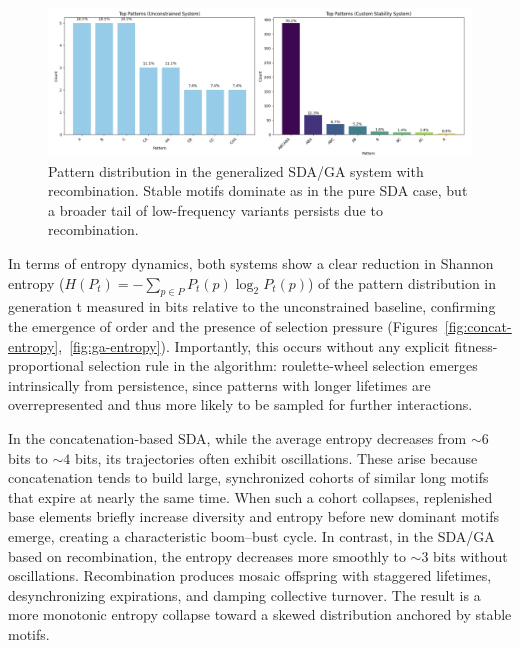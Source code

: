\documentclass[life,article,submit,pdftex,moreauthors]{Definitions/mdpi}
\begin{document}
\begin{figure}[H]
    \centering
    \includegraphics[width=1\textwidth]{SDA-GA-patterns.png}
    \caption{Pattern distribution in the generalized SDA/GA system with recombination. Stable motifs dominate as in the pure SDA case, but a broader tail of low-frequency variants persists due to recombination.}
    \label{fig:ga-patterns}
\end{figure}

In terms of entropy dynamics, both systems show a clear reduction in Shannon entropy ($H(P_t) = - \sum_{p \in P} P_t(p) \log_2 P_t(p)$) of
the pattern distribution in generation t measured in bits relative to the unconstrained baseline, confirming the emergence of order and the presence of selection pressure (Figures~\ref{fig:concat-entropy},~\ref{fig:ga-entropy}). Importantly, this occurs without any explicit fitness-proportional selection rule in the algorithm: roulette-wheel selection emerges intrinsically from persistence, since patterns with longer lifetimes are overrepresented and thus more likely to be sampled for further interactions.

In the concatenation-based SDA, while the average entropy decreases from $\sim6$ bits to $\sim4$ bits, its trajectories often exhibit oscillations. These arise because concatenation tends to build large, synchronized cohorts of similar long motifs that expire at nearly the same time. When such a cohort collapses, replenished base elements briefly increase diversity and entropy before new dominant motifs emerge, creating a characteristic boom–bust cycle. In contrast, in the SDA/GA based on recombination, the entropy decreases more smoothly to $\sim3$ bits without oscillations. Recombination produces mosaic offspring with staggered lifetimes, desynchronizing expirations, and damping collective turnover. The result is a more monotonic entropy collapse toward a skewed distribution anchored by stable motifs.
\end{document}

